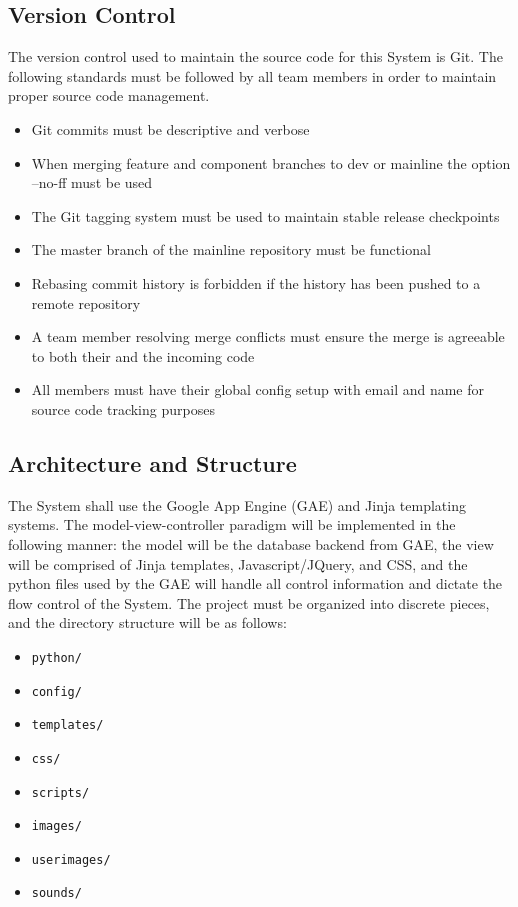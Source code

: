 \documentclass[12pt]{IEEEtran}
\begin{document}
\subsection{Version Control}
\label{subsec:git}

	The version control used to maintain the source code for this System is Git. The following standards must be followed by all team members in order to maintain proper source code management.
	\begin{itemize}
		\item Git commits must be descriptive and verbose
		\item When merging feature and component branches to dev or mainline the option --no-ff must be used
		\item The Git tagging system must be used to maintain stable release checkpoints
		\item The master branch of the mainline repository must be functional
		\item Rebasing commit history is forbidden if the history has been pushed to a remote repository
		\item A team member resolving merge conflicts must ensure the merge is agreeable to both their and the incoming code
		\item All members must have their global config setup with email and name for source code tracking purposes
	\end{itemize}
	

\subsection{Architecture and Structure}
\label{subsec:arch}

	The System shall use the Google App Engine (GAE) and Jinja templating systems. The model-view-controller 			paradigm will be implemented in the following manner: the model will be the database backend from GAE, the view will be comprised of Jinja templates, Javascript/JQuery, and CSS, and the python files used by the GAE will handle all control 			information and dictate the flow control of the System. The project must be organized into discrete pieces, and the directory structure will 			be as follows:
	
	\newpage

	\begin{itemize}
		\item \texttt{python/}
		\item \texttt{config/}
		\item \texttt{templates/}
		\item \texttt{css/}
		\item \texttt{scripts/}
		\item \texttt{images/}
		\item \texttt{userimages/}
		\item \texttt{sounds/}
	\end{itemize}
\end{document}

